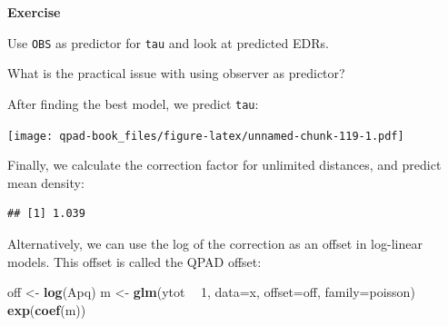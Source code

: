 \documentclass[12pt,]{book}
\newenvironment{Shaded}{\begin{snugshade}}{\end{snugshade}}
\newcommand{\DataTypeTok}[1]{\textcolor[rgb]{0.13,0.29,0.53}{#1}}
\newcommand{\DecValTok}[1]{\textcolor[rgb]{0.00,0.00,0.81}{#1}}
\newcommand{\KeywordTok}[1]{\textcolor[rgb]{0.13,0.29,0.53}{\textbf{#1}}}
\newcommand{\NormalTok}[1]{#1}
\newcommand{\OperatorTok}[1]{\textcolor[rgb]{0.81,0.36,0.00}{\textbf{#1}}}
\newcommand{\StringTok}[1]{\textcolor[rgb]{0.31,0.60,0.02}{#1}}
\let\BeginKnitrBlock\begin \let\EndKnitrBlock\end
\begin{document}
\BeginKnitrBlock{rmdexercise}
\textbf{Exercise}

Use \texttt{OBS} as predictor for \texttt{tau} and look at predicted EDRs.

What is the practical issue with using observer as predictor?
\EndKnitrBlock{rmdexercise}

After finding the best model, we predict \texttt{tau}:

\begin{Shaded}
\end{Shaded}

\texttt{[image: qpad-book\_files/figure-latex/unnamed-chunk-119-1.pdf]}

Finally, we calculate the correction factor for unlimited distances,
and predict mean density:

\begin{Shaded}
\end{Shaded}

\begin{verbatim}
## [1] 1.039
\end{verbatim}

Alternatively, we can use the log of the correction
as an offset in log-linear models. This offset is
called the QPAD offset:

\begin{Shaded}
\begin{Highlighting}[]
\NormalTok{off <-}\StringTok{ }\KeywordTok{log}\NormalTok{(Apq)}
\NormalTok{m <-}\StringTok{ }\KeywordTok{glm}\NormalTok{(ytot }\OperatorTok{~}\StringTok{ }\DecValTok{1}\NormalTok{, }\DataTypeTok{data=}\NormalTok{x, }\DataTypeTok{offset=}\NormalTok{off, }\DataTypeTok{family=}\NormalTok{poisson)}
\KeywordTok{exp}\NormalTok{(}\KeywordTok{coef}\NormalTok{(m))}
\end{Highlighting}
\end{Shaded}
\end{document}
